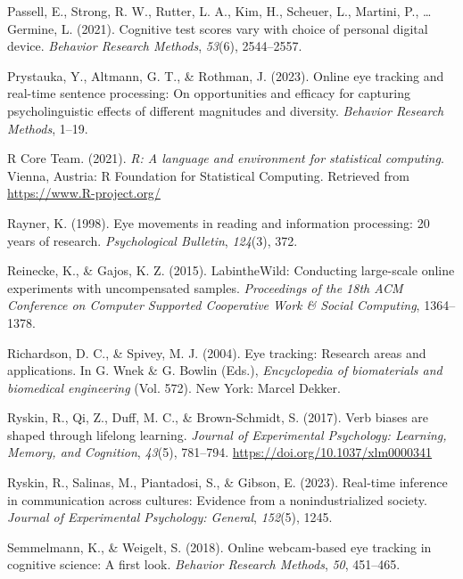 \documentclass[
  man,floatsintext]{apa6}
\newlength{\cslhangindent}
\newenvironment{CSLReferences}[2] %
 {\begin{list}{}{%
  \setlength{\itemindent}{0pt}
  \setlength{\leftmargin}{0pt}
  \setlength{\parsep}{0pt}
  \ifodd #1
   \setlength{\leftmargin}{\cslhangindent}
   \setlength{\itemindent}{-1\cslhangindent}
  \fi
  \setlength{\itemsep}{#2\baselineskip}}}
 {\end{list}}
\begin{document}
\begin{CSLReferences}{1}{0}
Passell, E., Strong, R. W., Rutter, L. A., Kim, H., Scheuer, L., Martini, P., \ldots{} Germine, L. (2021). Cognitive test scores vary with choice of personal digital device. \emph{Behavior Research Methods}, \emph{53}(6), 2544--2557.

Prystauka, Y., Altmann, G. T., \& Rothman, J. (2023). Online eye tracking and real-time sentence processing: On opportunities and efficacy for capturing psycholinguistic effects of different magnitudes and diversity. \emph{Behavior Research Methods}, 1--19.

R Core Team. (2021). \emph{R: A language and environment for statistical computing}. Vienna, Austria: R Foundation for Statistical Computing. Retrieved from \url{https://www.R-project.org/}

Rayner, K. (1998). Eye movements in reading and information processing: 20 years of research. \emph{Psychological Bulletin}, \emph{124}(3), 372.

Reinecke, K., \& Gajos, K. Z. (2015). LabintheWild: Conducting large-scale online experiments with uncompensated samples. \emph{Proceedings of the 18th ACM Conference on Computer Supported Cooperative Work \& Social Computing}, 1364--1378.

Richardson, D. C., \& Spivey, M. J. (2004). Eye tracking: {Research} areas and applications. In G. Wnek \& G. Bowlin (Eds.), \emph{Encyclopedia of biomaterials and biomedical engineering} (Vol. 572). New York: Marcel Dekker.

Ryskin, R., Qi, Z., Duff, M. C., \& Brown-Schmidt, S. (2017). Verb biases are shaped through lifelong learning. \emph{Journal of Experimental Psychology: Learning, Memory, and Cognition}, \emph{43}(5), 781--794. \url{https://doi.org/10.1037/xlm0000341}

Ryskin, R., Salinas, M., Piantadosi, S., \& Gibson, E. (2023). Real-time inference in communication across cultures: Evidence from a nonindustrialized society. \emph{Journal of Experimental Psychology: General}, \emph{152}(5), 1245.

Semmelmann, K., \& Weigelt, S. (2018). Online webcam-based eye tracking in cognitive science: A first look. \emph{Behavior Research Methods}, \emph{50}, 451--465.


\end{CSLReferences}
\end{document}
